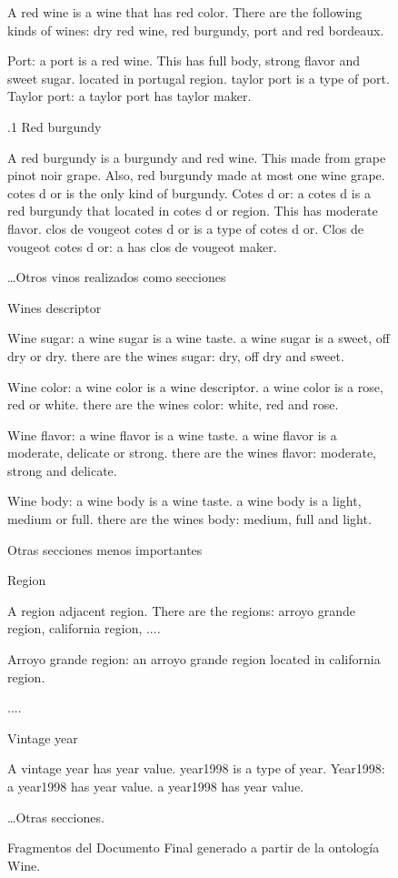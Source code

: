 \begin{figure}
{\begin{minipage}{14cm}
\small{
A red wine is a wine that has red color. There are the following kinds of wines: dry red wine, red burgundy, port and red bordeaux. 

Port: a port is a red wine. This has full body, strong flavor and sweet sugar. located in portugal region. taylor port is a type of port. 
Taylor port: a taylor port has taylor maker. 
}


\large{
.1 Red burgundy
}

\small{
A red burgundy is a burgundy and red wine. This made from grape pinot noir grape. Also, red burgundy made at most one wine grape. cotes d or is the only kind of burgundy. 
Cotes d or: a cotes d is a red burgundy that located in cotes d or region. This has moderate flavor. clos de vougeot cotes d or is a type of cotes d or. 
Clos de vougeot cotes d or:	a has clos de vougeot maker. 
}

\small{\dots Otros vinos realizados como secciones}

\large{
 Wines descriptor
}

\small{
Wine sugar:	a wine sugar is a wine taste. a wine sugar is a sweet, off dry or dry. there are the wines sugar: dry, off dry and sweet. 

Wine color: a wine color is a wine descriptor. a wine color is a rose, red or white. there are the wines color: white, red and rose. 

Wine flavor: a wine flavor is a wine taste. a wine flavor is a moderate, delicate or strong. there are the wines flavor: moderate, strong and delicate. 

Wine body: a wine body is a wine taste. a wine body is a light, medium or full. there are the wines body: medium, full and light. 
}

\large{
\noindent Otras secciones menos importantes
}

\large{
 Region
}

\small{
A region adjacent region. There are the regions: arroyo grande region, california region, ....

Arroyo grande region: an arroyo grande region located in california region. 

....
}

\large{
 Vintage year
}

\small{
A vintage year has year value. year1998 is a type of year. 
Year1998: a year1998 has year value. a year1998 has year value. 
}

\small{
\dots Otras secciones.
}

\end{minipage}
}
\caption{Fragmentos del Documento Final generado a partir de la ontología Wine.}
\label{fig:doc_final_wine}
\end{figure}


